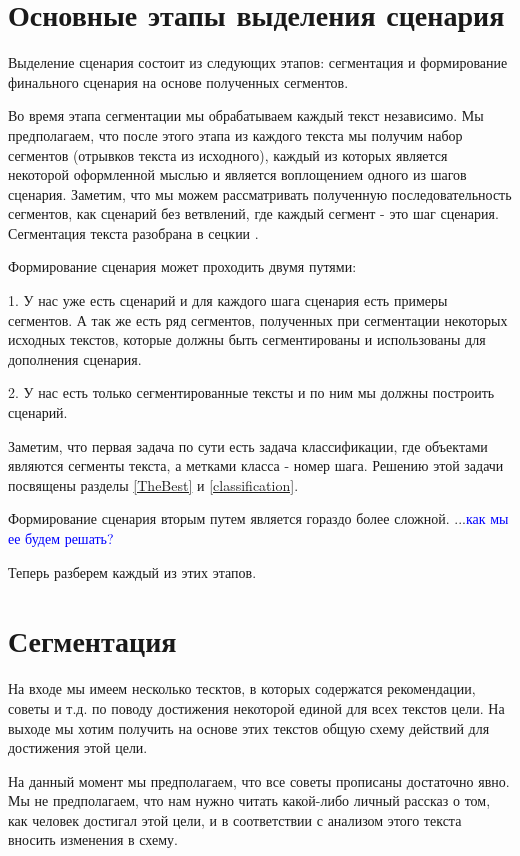 \documentclass[12pt]{article}
\begin{document}
\tableofcontents
\newpage

\section{Основные этапы выделения сценария}
\label{marker1}

Выделение сценария состоит из следующих этапов: сегментация и формирование финального сценария на основе полученных сегментов.

Во время  этапа сегментации мы обрабатываем каждый текст независимо. Мы предполагаем, что после этого этапа из каждого текста мы получим набор сегментов (отрывков текста из исходного), каждый из которых является некоторой оформленной мыслью и является воплощением одного из шагов сценария. Заметим, что мы можем рассматривать полученную последовательность сегментов, как сценарий без ветвлений, где каждый сегмент  - это шаг сценария. Сегментация текста разобрана в сецкии .

Формирование сценария может проходить двумя путями: 

1. У нас уже есть сценарий и для каждого шага сценария есть примеры сегментов. А так же есть ряд сегментов, полученных при сегментации некоторых исходных текстов, которые должны быть сегментированы и использованы для дополнения сценария.

2. У нас есть только сегментированные тексты и по ним мы должны построить сценарий.

Заметим, что первая задача по сути есть задача классификации, где объектами являются сегменты текста, а метками класса - номер шага. Решению этой задачи посвящены разделы \ref{TheBest} и \ref{classification}.

Формирование сценария вторым путем является гораздо более сложной. ...\textcolor{blue}{как мы ее будем решать?}

Теперь разберем каждый из этих этапов. 

\section{Сегментация}
\label{segm}

На входе мы имеем несколько тесктов, в которых содержатся рекомендации, советы и т.д. по поводу достижения некоторой единой для всех текстов цели. На выходе мы хотим получить на основе этих текстов общую схему действий для достижения этой цели.

На данный момент мы предполагаем, что все советы прописаны достаточно явно. Мы не предполагаем, что нам нужно читать какой-либо личный рассказ о том, как человек достигал этой цели, и в соответствии с анализом этого текста вносить изменения в схему.
\end{document}
